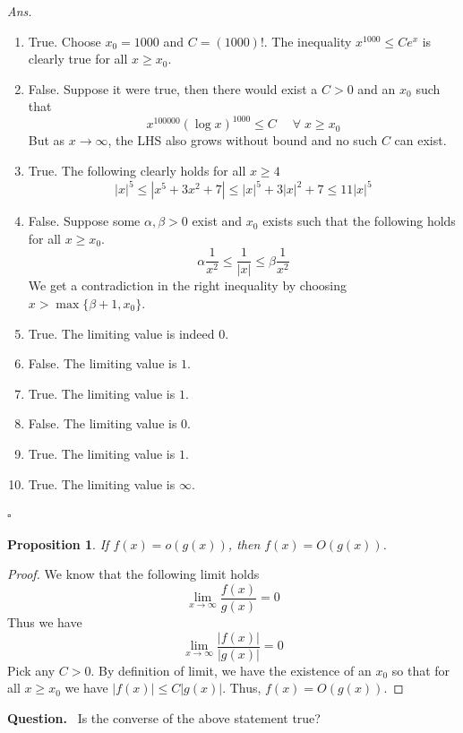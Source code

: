 \documentclass[10pt,openany]{book}
\newtheorem{proposition}[theorem]{Proposition}
\theoremstyle{italicnonumber}
\theoremstyle{definition}
\newenvironment{question}{\par\vspace{1ex}\noindent\textbf{Question.}\ }{\par}
\newenvironment{answer}{\par\noindent\emph{Ans.}\ }{\hfill$\square$\par\vspace{1ex}}
\let\oldforall\forall
\renewcommand{\forall}{\;\oldforall\;}
\begin{document}
\begin{answer}
\begin{enumerate}[label=(\roman*)]
  \item True. Choose $x_0 = 1000$ and $C=(1000)!$. The inequality $x^{1000} \leq C e^x$ is clearly true for all $x \geq x_0$.
  \item False. Suppose it were true, then there would exist a $C>0$ and an $x_0$ such that
  \[
  x^{100000} (\log{x})^{1000} \leq C \quad \forall x \geq x_0
  \]
  But as $x \to \infty$, the LHS also grows without bound and no such $C$ can exist.
  \item True. The following clearly holds for all $x \geq 4$
  \[
  |x|^5 \leq |x^5+3x^2+7| \leq |x|^5 + 3|x|^2 + 7 \leq 11 |x|^5
  \]
  \item False. Suppose some $\alpha, \beta >0$ exist and $x_0$ exists such that the following holds for all $x \geq x_0$.
  \[
  \alpha \frac{1}{x^2} \leq \frac{1}{|x|} \leq \beta \frac{1}{x^2}
  \]
  We get a contradiction in the right inequality by choosing $x > \max\{\beta + 1, x_0\}$.
  \item True. The limiting value is indeed $0$.
  \item False. The limiting value is $1$.
  \item True. The limiting value is $1$.
  \item False. The limiting value is $0$.
  \item True. The limiting value is $1$.
  \item True. The limiting value is $\infty$.
\end{enumerate}
\end{answer}

\begin{proposition}
  If $f(x) = o(g(x))$, then $f(x)=O(g(x))$.
\end{proposition}

\begin{proof}
  We know that the following limit holds
  \[
  \lim_{x \to \infty} \frac{f(x)}{g(x)} = 0
  \]
  Thus we have
  \[
  \lim_{x \to \infty} \frac{|f(x)|}{|g(x)|} = 0
  \]
  Pick any $C>0$. By definition of limit, we have the existence of an $x_0$ so that for all $x \geq x_0$ we have $|f(x)| \leq C |g(x)|$. Thus, $f(x) = O(g(x))$.
\end{proof}

\begin{question}
  Is the converse of the above statement true?
\end{question}
\end{document}
